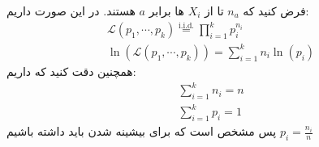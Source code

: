 \\
فرض کنید که
$n_a$
تا از
$X_{i}$
ها برابر $a$ هستند.
در این صورت داریم:
\begin{gather*}
    \mathcal{L}(p_1, \cdots , p_k) \stackrel{\text{i.i.d.}}{=} \prod_{i=1}^k p_i^{n_i}\\
    \ln(\mathcal{L}(p_1, \cdots , p_k)) = \sum_{i=1}^k n_i \ln (p_i)
\end{gather*}
همچنین دقت کنید که داریم:
\begin{gather*}
    \sum_{i=1}^k n_i = n\\
    \sum_{i=1}^k p_i = 1
\end{gather*}
پس مشخص است که برای بیشینه شدن باید داشته باشیم
$p_i = \frac{n_i}{n}$

